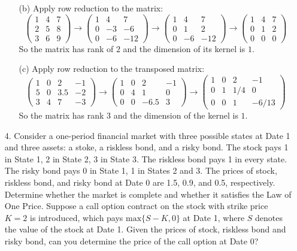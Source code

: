 \documentclass{article}
\begin{document}
\begin{enumerate}
\begin{enumerate}
            \item[(b)] Apply row reduction to the matrix:
            $$ \begin{pmatrix}1 &4 &7 \\ 2 &5 &8 \\ 3 &6 &9 \end{pmatrix} \rightarrow 
               \begin{pmatrix}1 &4 &7 \\ 0 &-3 &-6 \\ 0 &-6 &-12 \end{pmatrix} \rightarrow
               \begin{pmatrix}1 &4 &7 \\ 0 &1 &2 \\ 0 &-6 &-12 \end{pmatrix} \rightarrow 
               \begin{pmatrix}1 &4 &7 \\ 0 &1 &2 \\ 0 &0 &0 \end{pmatrix}
            $$
            So the matrix has rank of $2$ and the dimension of its kernel is $1$.
            
            \item[(c)] Apply row reduction to the transposed matrix:
            $$ \begin{pmatrix}1 &0 &2 &-1 \\5 &0 &3.5 &-2 \\3 &4 &7 &-3\end{pmatrix} \rightarrow
               \begin{pmatrix}1 &0 &2 &-1 \\0 &4 &1 &0 \\0 &0 &-6.5 &3\end{pmatrix} \rightarrow
               \begin{pmatrix}1 &0 &2 &-1 \\0 &1 &1/4 &0 \\0 &0 &1 &-6/13\end{pmatrix}
            $$
            So the matrix has rank $3$ and the dimension of the kernel is $1$.
            
        \end{enumerate}
        
        
    \item[4. ] Consider a one-period financial market with three possible states at Date 1 and three assets: a stoke, a riskless bond, and a risky bond. The stock pays 1 in State 1, 2 in State 2, 3 in State 3. The riskless bond pays 1 in every state. The risky bond pays 0 in State 1, 1 in States 2 and 3. The prices of stock, riskless bond, and risky bond at Date 0 are 1.5, 0.9, and 0.5, respectively. Determine whether the market is complete and whether it satisfies the Law of One Price. Suppose a call option contract on the stock with strike price $K = 2$ is introduced, which pays $\textrm{max} \{S - K, 0\}$ at Date 1, where $S$ denotes the value of the stock at Date 1. Given the prices of stock, riskless bond and risky bond, can you determine the price of the call option at Date 0? \\
    

\end{enumerate}
\end{document}
